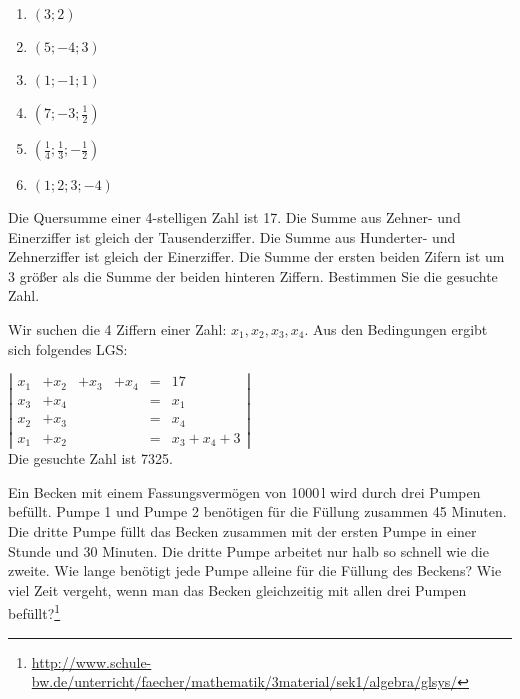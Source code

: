 \documentclass[12pt,a4paper,twoside,fleqn]{article}
\begin{document}
\begin{solution}
  \begin{multicols}{4}
    \begin{enumerate}
    \item $(3;2)$
    \item $(5;-4;3)$
    \item $(1;-1;1)$
    \item $(7;-3;\frac 1 2)$
    \item $(\frac 1 4; \frac 1 3;-\frac 1 2)$
    \item $(1;2;3;-4)$
    \end{enumerate}
  \end{multicols}
\end{solution}
\begin{question}%
  Die Quersumme einer 4-stelligen Zahl ist 17. Die Summe aus Zehner-
  und Einerziffer ist gleich der Tausenderziffer. Die Summe aus
  Hunderter- und Zehnerziffer ist gleich der Einerziffer. Die Summe
  der ersten beiden Zifern ist um 3 größer als die Summe der beiden
  hinteren Ziffern.  Bestimmen Sie die gesuchte Zahl.
\end{question}
\begin{solution}
  Wir suchen die 4 Ziffern einer Zahl: $x_1,x_2, x_3, x_4$. Aus den
  Bedingungen ergibt sich folgendes LGS:

    $\left|
        \begin{array}{rlllcl}
          x_1&+x_2&+x_3&+x_4&=& 17\\
          x_3&+x_4&&&=&x_1 \\
          x_2&+x_3&&&=&x_4\\
          x_1&+x_2&&&=&x_3+x_4+3
        \end{array}\right|$ \\
     Die gesuchte Zahl ist 7325.
\end{solution}
\begin{question}
  Ein Becken mit einem Fassungsvermögen von 1000\,l wird durch drei
  Pumpen befüllt. Pumpe 1 und Pumpe 2 benötigen für die Füllung
  zusammen 45 Minuten. Die dritte Pumpe füllt das Becken zusammen mit
  der ersten Pumpe in einer Stunde und 30 Minuten. Die dritte Pumpe
  arbeitet nur halb so schnell wie die zweite. 
  Wie lange benötigt jede
  Pumpe alleine für die Füllung des Beckens? 
  Wie viel Zeit vergeht,
  wenn man das Becken gleichzeitig mit allen drei Pumpen
  befüllt?\footnote{\url{http://www.schule-bw.de/unterricht/faecher/mathematik/3material/sek1/algebra/glsys/}}
\end{question}
\end{document}
